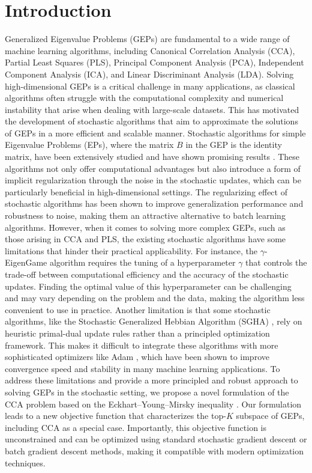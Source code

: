 \section{Introduction}
Generalized Eigenvalue Problems (GEPs) are fundamental to a wide range of machine learning algorithms, including Canonical Correlation Analysis (CCA), Partial Least Squares (PLS), Principal Component Analysis (PCA), Independent Component Analysis (ICA), and Linear Discriminant Analysis (LDA). Solving high-dimensional GEPs is a critical challenge in many applications, as classical algorithms often struggle with the computational complexity and numerical instability that arise when dealing with large-scale datasets. This has motivated the development of stochastic algorithms that aim to approximate the solutions of GEPs in a more efficient and scalable manner.
Stochastic algorithms for simple Eigenvalue Problems (EPs), where the matrix $B$ in the GEP is the identity matrix, have been extensively studied and have shown promising results \citep{arora2012stochastic,arora2016stochastic}. These algorithms not only offer computational advantages but also introduce a form of implicit regularization through the noise in the stochastic updates, which can be particularly beneficial in high-dimensional settings. The regularizing effect of stochastic algorithms has been shown to improve generalization performance and robustness to noise, making them an attractive alternative to batch learning algorithms.
However, when it comes to solving more complex GEPs, such as those arising in CCA and PLS, the existing stochastic algorithms have some limitations that hinder their practical applicability. For instance, the $\gamma$-EigenGame algorithm \citep{gemp20,gemp2021} requires the tuning of a hyperparameter $\gamma$ that controls the trade-off between computational efficiency and the accuracy of the stochastic updates. Finding the optimal value of this hyperparameter can be challenging and may vary depending on the problem and the data, making the algorithm less convenient to use in practice.
Another limitation is that some stochastic algorithms, like the Stochastic Generalized Hebbian Algorithm (SGHA) \citep{chen2019constrained}, rely on heuristic primal-dual update rules rather than a principled optimization framework. This makes it difficult to integrate these algorithms with more sophisticated optimizers like Adam \citep{kingma2014adam}, which have been shown to improve convergence speed and stability in many machine learning applications.
To address these limitations and provide a more principled and robust approach to solving GEPs in the stochastic setting, we propose a novel formulation of the CCA problem based on the Eckhart--Young--Mirsky inequality \citep{stewart_matrix_1990, eckart1936approximation,mirsky1960symmetric }. Our formulation leads to a new objective function that characterizes the top-$K$ subspace of GEPs, including CCA as a special case. Importantly, this objective function is unconstrained and can be optimized using standard stochastic gradient descent or batch gradient descent methods, making it compatible with modern optimization techniques.
